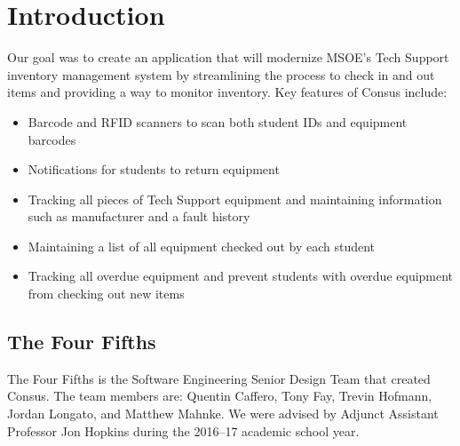 \chapter{Introduction}
\label{ch:introduction}

Our goal was to create an application that will modernize MSOE's Tech Support inventory management system by streamlining the process to check in and out items and providing a way to monitor inventory.
Key features of Consus include:
\begin{itemize}
  \item Barcode and RFID scanners to scan both student IDs and equipment barcodes
  \item Notifications for students to return equipment
  \item Tracking all pieces of Tech Support equipment and maintaining information such as manufacturer and a fault history
  \item Maintaining a list of all equipment checked out by each student
  \item Tracking all overdue equipment and prevent students with overdue equipment from checking out new items
\end{itemize}

\section{The Four Fifths}

The Four Fifths is the Software Engineering Senior Design Team that created Consus.
The team members are: Quentin Caffero, Tony Fay, Trevin Hofmann, Jordan Longato, and Matthew Mahnke.
We were advised by Adjunct Assistant Professor Jon Hopkins during the 2016--17 academic school year.
